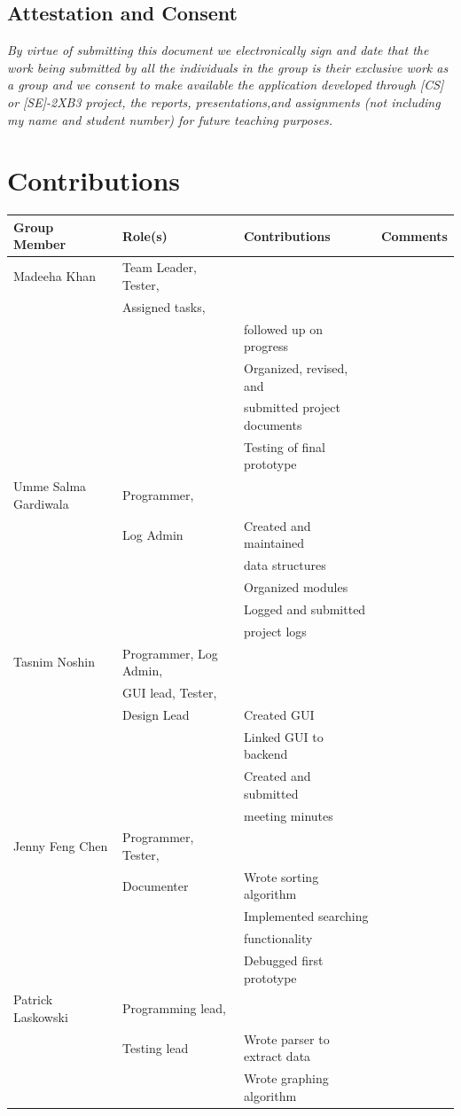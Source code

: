 \documentclass[12pt,fleqn]{article}
\begin{document}
\subsection*{Attestation and Consent}
\textit{By virtue of submitting this document we electronically sign and date that the  work  being  submitted  by  all  the  individuals  in  the  group  is  their  exclusive work as a group and we consent to make available the application developed  through  [CS]  or  [SE]-2XB3  project,  the  reports,  presentations,and assignments (not including my name and student number) for future teaching purposes.}


\newpage
\section*{Contributions}\label{contributions}
\begin{tabular}{| l | l | l | l |}
\hline
\textbf{Group Member} & \textbf{Role(s)} & \textbf{Contributions} & \textbf{Comments}\\
\hline
Madeeha Khan & Team Leader, Tester, \\&Assigned tasks, \\&&followed up on progress & ~\\
\hline
~ & ~ & Organized, revised, and \\&&submitted project documents & ~\\
\hline
~ & ~ & Testing of final prototype & ~\\
\hline
Umme Salma Gardiwala & Programmer, \\&Log Admin & Created and maintained \\&&data structures & ~\\
\hline
~ & ~ & Organized modules & ~\\
\hline
~ &~ & Logged and submitted \\&&project logs & ~\\
\hline
Tasnim Noshin & Programmer, Log Admin, \\&GUI lead, Tester, \\&Design Lead & Created GUI & ~\\
\hline
 & &Linked GUI to backend  & ~\\
\hline
 & & Created and submitted \\&&meeting minutes & ~\\
\hline
Jenny Feng Chen &Programmer, Tester, \\&Documenter  &  Wrote sorting algorithm& ~\\
\hline
 & &  Implemented searching \\&&functionality& ~\\
\hline
 & & Debugged first prototype & ~\\
\hline
 Patrick Laskowski& Programming lead, \\&Testing lead& Wrote parser to extract data & ~\\
\hline
 & &  Wrote graphing algorithm& ~\\
\hline
\end{tabular}
\end{document}
